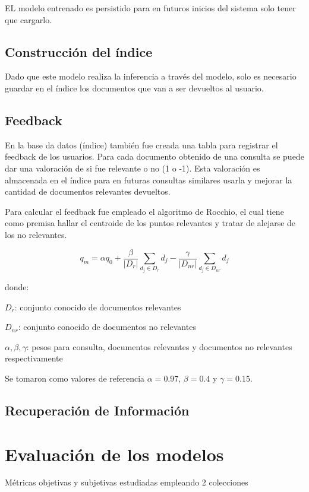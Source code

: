 \documentclass[12pt]{llncs}
\begin{document}
EL modelo entrenado es persistido para en futuros inicios del sistema solo tener que cargarlo.

\subsection{Construcción del índice}

Dado que este modelo realiza la inferencia a través del modelo, solo es necesario guardar en el índice los documentos que van a ser devueltos al usuario.

\subsection{Feedback}

En la base da datos (índice) también fue creada una tabla para registrar el feedback de los usuarios. Para cada documento obtenido de una consulta se puede dar una valoración de si fue relevante o no (1 o -1). Esta valoración es almacenada en el índice para en futuras consultas similares usarla y mejorar la cantidad de documentos relevantes devueltos.

Para calcular el feedback fue empleado el algoritmo de Rocchio, el cual tiene como premisa hallar el centroide de los puntos relevantes y tratar de alejarse de los no relevantes.

$$q_m = \alpha q_0 + \frac{\beta}{|D_r|} \sum_{d_j \in D_r} d_j - \frac{\gamma}{|D_{nr}|} \sum_{d_j \in D_{nr}} d_j$$

donde:

$D_r$: conjunto conocido de documentos relevantes

$D_{nr}$: conjunto conocido de documentos no relevantes

$\alpha, \beta, \gamma$: pesos para consulta, documentos relevantes y documentos no relevantes respectivamente

Se tomaron como valores de referencia $\alpha = 0.97$, $\beta = 0.4$ y $\gamma = 0.15$.

\subsection{Recuperación de Información}

\section{Evaluación de los modelos}

Métricas objetivas y subjetivas estudiadas empleando 2 colecciones
\end{document}
